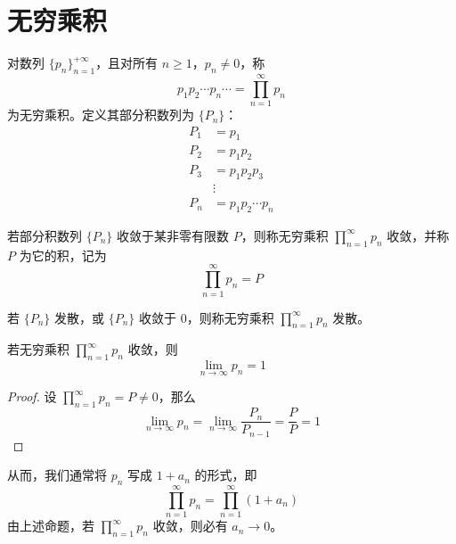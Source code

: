 \section{无穷乘积}
\begin{definition}
	对数列 $\{p_n\}_{n=1}^{+\infty}$，且对所有 $n \ge 1$，$p_n \neq 0$，称
	\[
	p_1 p_2 \cdots p_n \cdots = \prod_{n=1}^{\infty} p_n
	\]
	为无穷乘积。定义其部分积数列为 $\{P_n\}$：
	\[
	\begin{aligned}
		P_1 &= p_1 \\
		P_2 &= p_1 p_2 \\
		P_3 &= p_1 p_2 p_3 \\
		&\vdots \\
		P_n &= p_1 p_2 \cdots p_n
	\end{aligned}
	\]
	
	若部分积数列 $\{P_n\}$ 收敛于某非零有限数 $P$，则称无穷乘积 $\displaystyle \prod_{n=1}^{\infty} p_n$ 收敛，并称 $P$ 为它的积，记为
	\[
	\prod_{n=1}^{\infty} p_n = P
	\]
	
	若 $\{P_n\}$ 发散，或 $\{P_n\}$ 收敛于 $0$，则称无穷乘积 $\displaystyle \prod_{n=1}^{\infty} p_n$ 发散。
\end{definition}
\begin{proposition}
	若无穷乘积 $\displaystyle \prod_{n=1}^{\infty} p_n$ 收敛，则
	\[
	\lim_{n \to \infty} p_n = 1
	\]
\end{proposition}
\begin{proof}
	设 $\displaystyle \prod_{n=1}^{\infty} p_n = P \neq 0$，那么
	\[
	\lim_{n \to \infty} p_n = \lim_{n \to \infty} \frac{P_n}{P_{n-1}} = \frac{P}{P} = 1
	\]
\end{proof}



从而，我们通常将 $p_n$ 写成 $1 + a_n$ 的形式，即
\[
\prod_{n=1}^{\infty} p_n = \prod_{n=1}^{\infty} (1 + a_n)
\]
由上述命题，若 $\displaystyle \prod_{n=1}^{\infty} p_n$ 收敛，则必有 $a_n \to 0$。

